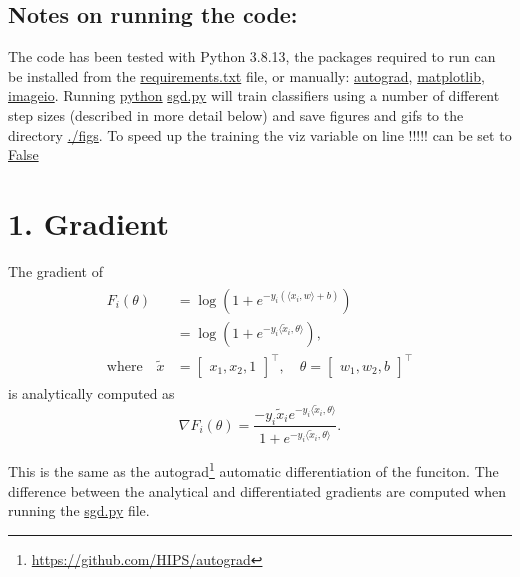 \documentclass{article}
\begin{document}
\subsection*{Notes on running the code:}
The code has been tested with Python 3.8.13, the packages required to run can be installed from the \url{requirements.txt} file, or manually: \url{autograd}, \url{matplotlib}, \url{imageio}. Running \url{python} \url{sgd.py} will train classifiers using a number of different step sizes (described in more detail below) and save figures and gifs to the directory \url{./figs}. To speed up the training the viz variable on line !!!!! can be set to \url{False}
    \section*{1. Gradient}
    The gradient of
    \begin{align}
    \begin{split}
        F_i(\theta) &= \log(1 + e^{-y_i (\langle x_i, w \rangle + b)}) \\
        &= \log(1 + e^{-y_i \langle \tilde{x}_i, \theta \rangle}) , \\ 
        \text{where} \quad \tilde{x} &= \begin{bmatrix}
            x_1, x_2, 1
        \end{bmatrix}^\top, \quad \theta = \begin{bmatrix}
            w_1, w_2, b
        \end{bmatrix}^\top
    \end{split}
\end{align}
is analytically computed as
\begin{equation}
    \nabla F_i(\theta) = \frac{-y_i \tilde{x}_i e^{-y_i\langle \tilde{x}_i, \theta \rangle}}{1 + e^{-y_i \langle \tilde{x}_i, \theta \rangle}}.
\end{equation}

This is the same as the autograd\footnote{\url{https://github.com/HIPS/autograd}} automatic differentiation of the funciton. The difference between the analytical and differentiated gradients are computed when running the \url{sgd.py} file.
\end{document}
